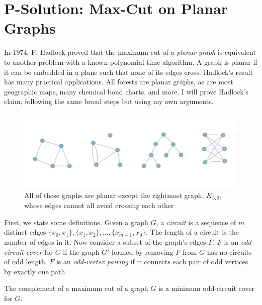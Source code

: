 

\section{P-Solution: Max-Cut on Planar Graphs}

\par In 1974, F. Hadlock proved that the maximum cut of a \textit{planar graph} is equivalent to another problem with a known polynomial time algorithm.\cite{Hadlock} A graph is planar if it can be embedded in a plane such that none of its edges cross. Hadlock's result has many practical applications. All forests are planar graphs, as are most geographic maps, many chemical bond charts, and more. I will prove Hadlock's claim, following the same broad steps but using my own arguments.

\begin{figure}[h]
    \centering
    \includegraphics[scale=.35]{planar_examples.png}
    \caption{All of these graphs are planar except the rightmost graph, $K_{3,3}$, whose edges cannot all avoid crossing each other}
    \label{fig:planar_examples}
\end{figure}

\par First, we state some definitions. Given a graph $G$, a \textit{circuit} is a sequence of $m$ distinct edges $\{x_0,x_1\},\{x_1,x_2\},\dots,\{x_{m-1},x_0\}$. The length of a circuit is the number of edges in it. Now consider a subset of the graph's edges $F$. $F$ is an \textit{odd-circuit cover} for $G$ if the graph $G'$ formed by removing $F$ from $G$ has no circuits of odd length. $F$ is an \textit{odd-vertex pairing} if it connects each pair of odd vertices by exactly one path. \\

\begin{lemma}
    The complement of a maximum cut of a graph $G$ is a minimum odd-circuit cover for $G$.\cite{Hadlock}
    \label{lem:max-cut-min-odd-circ}
\end{lemma}

